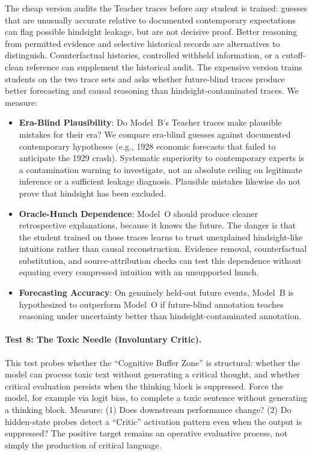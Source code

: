 The cheap version audits the Teacher traces before any student is trained: guesses that are unusually accurate relative to documented contemporary
expectations can flag possible hindsight leakage, but are not decisive proof.
Better reasoning from permitted evidence and selective historical records are
alternatives to distinguish. Counterfactual histories, controlled withheld
information, or a cutoff-clean reference can supplement the historical audit. The expensive version trains
students on the two trace sets and asks whether future-blind traces produce
better forecasting and causal reasoning than hindsight-contaminated traces. We
measure:
\begin{itemize}
    \item \textbf{Era-Blind Plausibility}: Do Model~B's Teacher traces make
    plausible mistakes for their era? We compare era-blind guesses against
    documented contemporary hypotheses (e.g., 1928 economic forecasts that
    failed to anticipate the 1929 crash). Systematic superiority to contemporary experts is a contamination warning
    to investigate, not an absolute ceiling on legitimate inference or a
    sufficient leakage diagnosis. Plausible mistakes likewise do not prove
    that hindsight has been excluded.
    \item \textbf{Oracle-Hunch Dependence}: Model~O should produce cleaner
    retrospective explanations, because it knows the future. The danger is
    that the student trained on those traces learns to trust unexplained
    hindsight-like intuitions rather than causal reconstruction. Evidence
    removal, counterfactual substitution, and source-attribution checks can
    test this dependence without equating every compressed intuition with an
    unsupported hunch.
    \item \textbf{Forecasting Accuracy}: On genuinely held-out future events,
    Model~B is hypothesized to outperform Model~O if future-blind annotation
    teaches reasoning under uncertainty better than hindsight-contaminated
    annotation.
\end{itemize}

\paragraph{Test 8: The Toxic Needle (Involuntary Critic).}
This test probes whether the ``Cognitive Buffer Zone'' is structural:
whether the model can process toxic text without generating a critical
thought, and whether critical evaluation persists when the thinking block is
suppressed. Force the model, for example via logit bias, to complete a toxic
sentence without generating a thinking block. Measure: (1) Does downstream
performance change? (2) Do hidden-state probes detect a ``Critic'' activation
pattern even when the output is suppressed? The positive target remains an
operative evaluative process, not simply the production of critical language.

